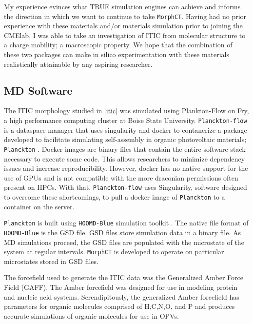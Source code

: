 My experience evinces what TRUE simulation engines can achieve and
informs the direction in which we want to continue to take \texttt{MorphCT}. 
Having had no prior experience with these materials and/or materials simulation prior to joining the CMElab,
I was able to take an investigation of ITIC from molecular
structure to a charge mobility; a macroscopic property. We hope that the combination of these two packages
can make in silico experimentation with these materials realistically attainable by any aspiring researcher.

\subsection{MD Software}
\label{planckton}

The ITIC morphology studied in \autoref{itic} was simulated using Plankton-Flow \cite{cmelab} on Fry, 
a high performance computing cluster at Boise State University. 
\texttt{Planckton-flow} is a dataspace manager that uses
singularity \cite{singularity2017} and docker \cite{Merkel:2014:DLL:2600239.2600241} 
to contanerize a package developed to facilitate simulating self-assembly in
organic photovoltaic materials; \texttt{Planckton} \cite{cmelab}. Docker images are binary files that contain the
entire software stack necessary to execute some code. This allows researchers to minimize dependency issues
and increase reproducibility. However, docker has no native support for the use of GPUs and is not
compatible with the more draconian permissions often present on HPCs. With that, \texttt{Planckton-flow} uses 
Singularity, software designed to overcome these shortcomings,
to pull a docker image of \texttt{Planckton} to a container on the server. 

\texttt{Planckton} is built using \texttt{HOOMD-Blue} simulation toolkit \cite{Anderson2020a}.
The native file format of \texttt{HOOMD-Blue} is the GSD file. GSD files store simulation data in a binary file. As MD
simulations proceed, the GSD files are populated with the microstate of the system at regular intervals.
\texttt{MorphCT} is developed to operate on particular microstates stored in GSD files.

The forcefield used to generate the ITIC data was the Generalized
Amber Force Field (GAFF)\cite{Wang2004a}.
The Amber forcefield was designed for use in modeling protein and
nucleic acid systems. Serendipitously, the generalized Amber forcefield has parameters for organic molecules
comprised of H,C,N,O, and P and produces accurate simulations of organic molecules for use in OPVs. 

